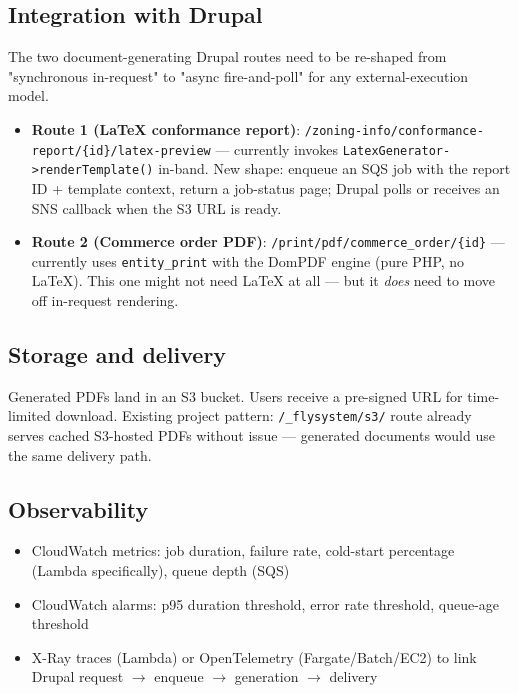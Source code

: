 \documentclass[11pt,letterpaper]{article}
\begin{document}
\subsection{Integration with Drupal}
The two document-generating Drupal routes need to be re-shaped from "synchronous in-request" to "async fire-and-poll" for any external-execution model.

\begin{itemize}[nosep]
  \item \textbf{Route 1 (LaTeX conformance report)}: \texttt{/zoning-info/conformance-report/\{id\}/latex-preview} --- currently invokes \texttt{LatexGenerator->renderTemplate()} in-band. New shape: enqueue an SQS job with the report ID + template context, return a job-status page; Drupal polls or receives an SNS callback when the S3 URL is ready.
  \item \textbf{Route 2 (Commerce order PDF)}: \texttt{/print/pdf/commerce\_order/\{id\}} --- currently uses \texttt{entity\_print} with the DomPDF engine (pure PHP, no LaTeX). This one might not need LaTeX at all --- but it \emph{does} need to move off in-request rendering.
\end{itemize}

\subsection{Storage and delivery}
Generated PDFs land in an S3 bucket. Users receive a pre-signed URL for time-limited download. Existing project pattern: \texttt{/\_flysystem/s3/} route already serves cached S3-hosted PDFs without issue --- generated documents would use the same delivery path.

\subsection{Observability}
\begin{itemize}[nosep]
  \item CloudWatch metrics: job duration, failure rate, cold-start percentage (Lambda specifically), queue depth (SQS)
  \item CloudWatch alarms: p95 duration threshold, error rate threshold, queue-age threshold
  \item X-Ray traces (Lambda) or OpenTelemetry (Fargate/Batch/EC2) to link Drupal request $\rightarrow$ enqueue $\rightarrow$ generation $\rightarrow$ delivery
\end{itemize}
\end{document}
